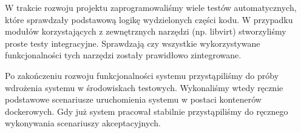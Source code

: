 \documentclass[../analiza-rozwiazania.tex]{subfiles}
\begin{document}
W trakcie rozwoju projektu zaprogramowaliśmy wiele testów automatycznych, które sprawdzały podstawową logikę wydzielonych części kodu.
W przypadku modułów korzystających z zewnętrznych narzędzi (np. libvirt) stworzyliśmy proste testy integracyjne.
Sprawdzają czy wszystkie wykorzystywane funkcjonalności tych narzędzi zostały prawidłowo zintegrowane.

Po zakończeniu rozwoju funkcjonalności systemu przystąpiliśmy do próby wdrożenia systemu w środowiskach testowych.
Wykonaliśmy wtedy ręcznie podstawowe scenariusze uruchomienia systemu w postaci kontenerów dockerowych.
Gdy już system pracował stabilnie przystąpiliśmy do ręcznego wykonywania scenariuszy akceptacyjnych.
\end{document}
